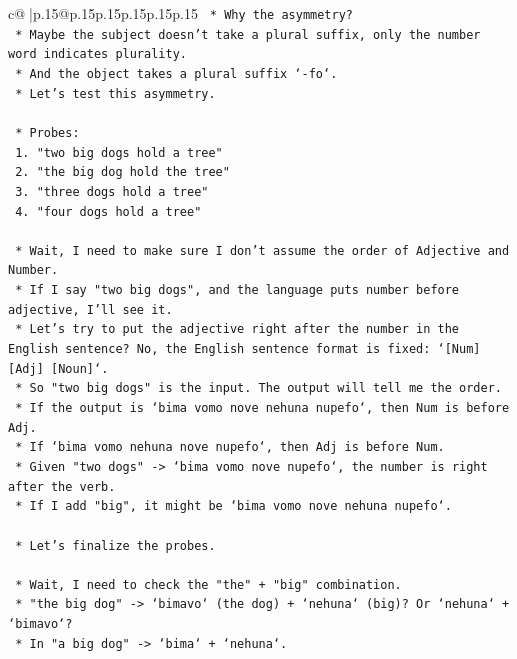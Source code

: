 \documentclass{article}
\begin{document}
{\begin{supertabular}{c@{$\;$}|p{.15\linewidth}@{}p{.15\linewidth}p{.15\linewidth}p{.15\linewidth}p{.15\linewidth}p{.15\linewidth}}
{{{\texttt{    *   Why the asymmetry?} \\
\texttt{    *   Maybe the subject doesn't take a plural suffix, only the number word indicates plurality.} \\
\texttt{    *   And the object takes a plural suffix `{-}fo`.} \\
\texttt{    *   Let's test this asymmetry.} \\
\\ 
\texttt{    *   Probes:} \\
\texttt{        1.  "two big dogs hold a tree"} \\
\texttt{        2.  "the big dog hold the tree"} \\
\texttt{        3.  "three dogs hold a tree"} \\
\texttt{        4.  "four dogs hold a tree"} \\
\\ 
\texttt{    *   Wait, I need to make sure I don't assume the order of Adjective and Number.} \\
\texttt{    *   If I say "two big dogs", and the language puts number before adjective, I'll see it.} \\
\texttt{    *   Let's try to put the adjective right after the number in the English sentence? No, the English sentence format is fixed: `{[}Num{]} {[}Adj{]} {[}Noun{]}`.} \\
\texttt{    *   So "two big dogs" is the input. The output will tell me the order.} \\
\texttt{    *   If the output is `bima vomo nove nehuna nupefo`, then Num is before Adj.} \\
\texttt{    *   If `bima vomo nehuna nove nupefo`, then Adj is before Num.} \\
\texttt{    *   Given "two dogs" {-}> `bima vomo nove nupefo`, the number is right after the verb.} \\
\texttt{    *   If I add "big", it might be `bima vomo nove nehuna nupefo`.} \\
\\ 
\texttt{    *   Let's finalize the probes.} \\
\\ 
\texttt{    *   Wait, I need to check the "the" + "big" combination.} \\
\texttt{    *   "the big dog" {-}> `bimavo` (the dog) + `nehuna` (big)? Or `nehuna` + `bimavo`?} \\
\texttt{    *   In "a big dog" {-}> `bima` + `nehuna`.} \\
}}}
\end{supertabular}}
\end{document}
